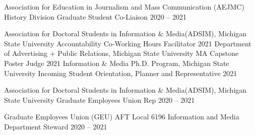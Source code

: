 

\begin{cvhonors}
  \cvhonor
    {Association for Education in Journalism and Mass Communication (AEJMC) History Division} %
    {Graduate Student Co-Liaison } %
    {} %
    {2020 -- 2021} %
 
\end{cvhonors}

\begin{cvhonors}
    \cvhonor
    {Association for Doctoral Students in Information \& Media(ADSIM), Michigan State University } %
    {Accountability Co-Working Hours Facilitator } %
    {} %
    {2021} %
  \cvhonor
    {Department of Advertising + Public Relations, Michigan State University } %
    {MA Capstone Poster Judge } %
    {} %
    {2021} %
 \cvhonor
    {Information \& Media Ph.D. Program, Michigan State University} %
    {Incoming Student Orientation, Planner and Representative } %
    {} %
    {2021} %
    
  \cvhonor
    {Association for Doctoral Students in Information \& Media(ADSIM), Michigan State University } %
    {Graduate Employees Union Rep } %
    {} %
    {2020 -- 2021} %

  \cvhonor
    {Graduate Employees Union (GEU) AFT Local 6196} %
    {Information and Media Department Steward } %
    {} %
    {2020 -- 2021} %
\end{cvhonors}\pagebreak

